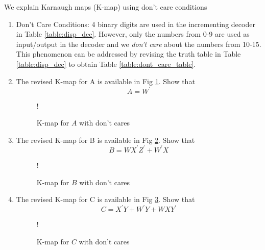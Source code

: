 We explain Karnaugh maps (K-map) using don't care conditions
%
\begin{enumerate}[label=\arabic*.,ref=\theenumi]
\item {Don't Care Conditions: }
4 binary digits are used in the incrementing decoder in 
		Table 
\ref{table:disp_dec}.
		However, only the numbers from 0-9 are used as input/output
in the decoder and we {\em don't care} about the numbers from 10-15.  This phenomenon can be addressed by revising the truth table in 
		Table 
\ref{table:disp_dec}
to obtain Table \ref{table:dont_care_table}.
\begin{table}[H]
	\centering

\caption{}
\label{table:dont_care_table}
\end{table}
\item  The revised K-map for A is available in Fig \ref{fig:kmap_A_x}.  Show that 
\begin{equation}
A = {W}^{\prime}
\end{equation}
\begin{figure}[H]
	\centering
\resizebox {0.5\columnwidth} {!} {

}
\caption{K-map for $A$ with don't cares}
\label{fig:kmap_A_x}
\end{figure}
%
\item  The revised K-map for B is available in Fig \ref{fig:kmap_B_x}.  Show that 
%
\begin{equation}
B = WX^{\prime}Z^{\prime} + W^{\prime}X
\end{equation}
\begin{figure}[!htb]
	\centering
\resizebox {0.5\columnwidth} {!} {

}
\caption{K-map for $B$ with don't cares}
\label{fig:kmap_B_x}
\end{figure}
%
\item  The revised K-map for C is available in Fig \ref{fig:kmap_C_x}.  Show that 
%
\begin{equation}
C = {X}^{\prime}{Y} + {W}^{\prime}{Y} + {W}{X}{Y}^{\prime}
\end{equation}
\begin{figure}[H]
	\centering
\resizebox {0.5\columnwidth} {!} {

}
\caption{K-map for $C$ with don't cares}
\label{fig:kmap_C_x}
\end{figure}

\end{enumerate}
